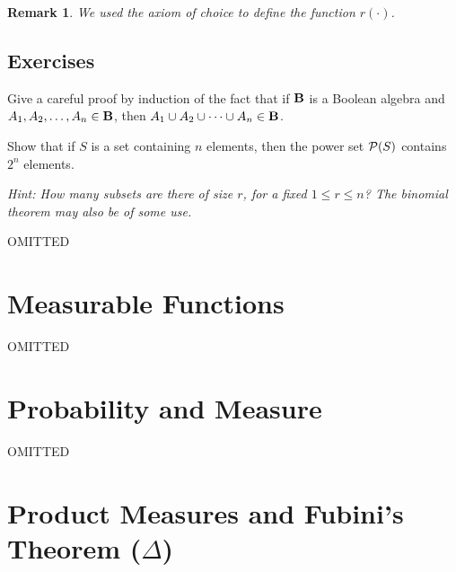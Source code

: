 \documentclass[a4paper]{report}
\newcounter{thm_counter}[chapter]
\newtheorem{remark}[thm_counter]{Remark}
\numberwithin{equation}{chapter}
\numberwithin{thm_counter}{section}
\begin{document}
\begin{remark}
We used the axiom of choice to define the function $r(\cdot)$. 
\end{remark}



\newpage
\section[Exercises 1]{Exercises}


\begin{pslist}

\item 
\label{ps:boolean_union}
Give a careful proof by induction of the fact that if ${\bf B}$ is a Boolean algebra and $A_{1}, A_{2}, \ldots, A_{n} \in {\bf B}$, then $A_{1} \cup A_{2} \cup \cdots \cup A_{n} \in {\bf B}$.

\item 
\label{ps:size_Pn}
Show that if $S$ is a set containing $n$ elements, then the power set ${\cal P}(S)$ contains $2^{n}$ elements.

\textit{Hint: How many subsets are there of size $r$, for a fixed $1 \leq r \leq n$? The binomial theorem may also be of some use.}

\item OMITTED

\end{pslist}




\chapter{Measurable Functions}
\label{chap:measurable_funcs}

OMITTED


\chapter{Probability and Measure}
\label{chap:prob_with_meas}

OMITTED



\chapter{Product Measures and Fubini's Theorem ($\Delta$)}
\label{chap:product_meas}
\end{document}

